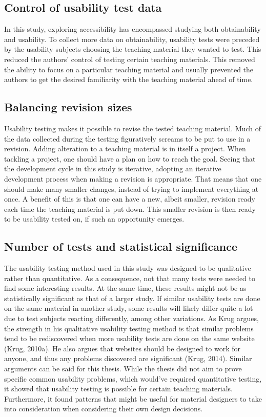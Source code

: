 \subsection{Control of usability test data}
In this study, exploring accessibility has encompassed studying both obtainability and usability. To collect more data on obtainability, usability tests were preceded by the usability subjects choosing the teaching material they wanted to test. This reduced the authors' control of testing certain teaching materials. 
This removed the ability to focus on a particular teaching material and usually prevented the authors to get the desired familiarity with the teaching material ahead of time.

\subsection{Balancing revision sizes}
Usability testing makes it possible to revise the tested teaching material. Much of the data collected during the testing figuratively screams to be put to use in a revision. Adding alteration to a teaching material is in itself a project. When tackling a project, one should have a plan on how to reach the goal. Seeing that the development cycle in this study is iterative, adopting an iterative development process when making a revision is appropriate. 
That means that one should make many smaller changes, instead of trying to implement everything at once. A benefit of this is that one can have a new, albeit smaller, revision ready each time the teaching material is put down. This smaller revision is then ready to be usability tested on, if such an opportunity emerges. 

\subsection{Number of tests and statistical significance}
The usability testing method used in this study was designed to be qualitative rather than quantitative. As a consequence, not that many tests were needed to find some interesting results. At the same time, these results might not be as statistically significant as that of a larger study. If similar usability tests are done on the same material in another study, some results will likely differ quite a lot due to test subjects reacting differently, among other variations.
As Krug argues, the strength in his qualitative usability testing method is that similar problems tend to be rediscovered when more usability tests are done on the same website (Krug, 2010a). He also argues that websites should be designed to work for anyone, and thus any problems discovered are significant (Krug, 2014). Similar arguments can be said for this thesis. While the thesis did not aim to prove specific common usability problems, which would've required quantitative testing, it showed that usability testing is possible for certain teaching materials. Furthermore, it found patterns that might be useful for material designers to take into consideration when considering their own design decisions.

